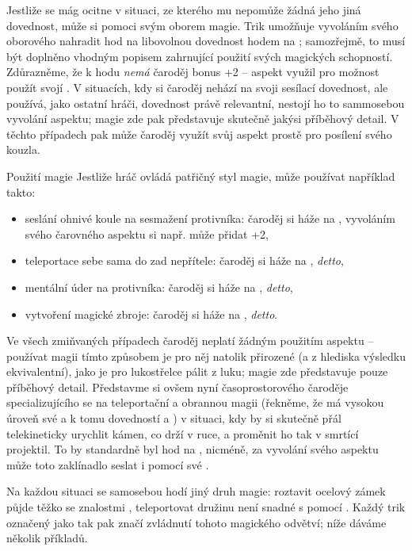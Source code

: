 \documentclass[../main.tex]{subfiles}
\begin{document}
Jestliže se mág ocitne v situaci, ze kterého mu nepomůže žádná jeho jiná dovednost, může si pomoci svým oborem magie. Trik  umožňuje vyvoláním svého oborového nahradit hod na libovolnou dovednost hodem na ; samozřejmě, to musí být doplněno vhodným popisem zahrnující použití svých magických schopností. Zdůrazněme, že k hodu \emph{nemá} čaroděj bonus +2 – aspekt využil pro možnost použít svojí . V situacích, kdy si čaroděj nehází na svoji sesílací dovednost, ale používá, jako ostatní hráči, dovednost právě relevantní, nestojí ho to sammosebou vyvolání aspektu; magie zde pak představuje skutečně jakýsi příběhový detail. V těchto případech pak může čaroděj využít svůj aspekt prostě pro posílení svého kouzla.

\begin{příklad}{Použití magie}
	Jestliže hráč ovládá patřičný styl magie, může používat například takto:
  \begin{itemize}
	  \item seslání ohnivé koule na sesmažení protivníka: čaroděj si háže na , vyvoláním svého čarovného aspektu si např. může přidat +2,
	  \item teleportace sebe sama do zad nepřítele: čaroděj si háže na , \emph{detto},
	  \item mentální úder na protivníka: čaroděj si háže na , \emph{detto},
	  \item vytvoření magické zbroje: čaroděj si háže na , \emph{detto}.
  \end{itemize}
  Ve všech zmiňvaných případech čaroděj neplatí žádným použitím aspektu – používat magii tímto způsobem je pro něj natolik přirozené (a z hlediska výsledku ekvivalentní), jako je pro lukostřelce pálit z luku; magie zde představuje pouze příběhový detail. Představme si ovšem nyní časoprostorového čaroděje specializujícího se na teleportační a obrannou magii (řekněme, že má vysokou úroveň své  a k tomu dovedností  a ) v situaci, kdy by si skutečně přál telekineticky urychlit kámen, co drží v ruce, a proměnit ho tak v smrtící projektil. To by standardně byl hod na  , nicméně, za vyvolání svého aspektu může toto zaklínadlo seslat i pomocí své . 
\end{příklad}

Na každou situaci se samosebou hodí jiný druh magie: roztavit ocelový zámek půjde těžko se znalostmi , teleportovat družinu není snadné s pomocí .  Každý trik označený jako  tak pak značí zvládnutí tohoto magického odvětví; níže dáváme několik příkladů. 
\end{document}
